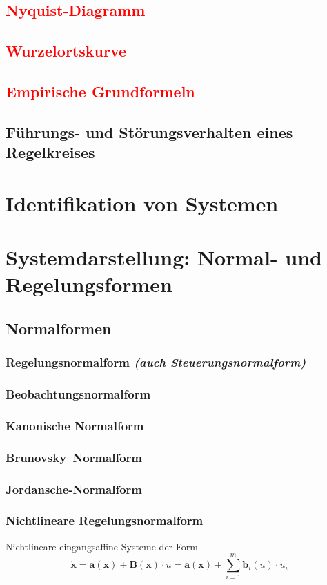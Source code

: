 	\subsection{\textcolor{red}{Nyquist-Diagramm}}
	\subsection{\textcolor{red}{Wurzelortskurve}}
	\subsection{\textcolor{red}{Empirische Grundformeln}}
	\subsection{Führungs- und Störungsverhalten eines Regelkreises}


\section{Identifikation von Systemen}

\section{Systemdarstellung: Normal- und Regelungsformen}
	\subsection{Normalformen}
	\subsubsection{Regelungsnormalform \textit{(auch Steuerungsnormalform)}}
	\subsubsection{Beobachtungsnormalform}
	\subsubsection{Kanonische Normalform}
	\subsubsection{Brunovsky–Normalform}
	\subsubsection{Jordansche-Normalform}
	\subsubsection{Nichtlineare Regelungsnormalform} \label{chapNL}
		Nichtlineare eingangsaffine Systeme der Form
		\begin{equation}
			\dot{\bm{x}}=\bm{a(x) + B(x)}\cdot u =\bm{a(x)}+\sum_{i=1}^{m}\bm{b}_{i}(u)\cdot u_{i}
			\label{nlrnf}
		\end{equation}

